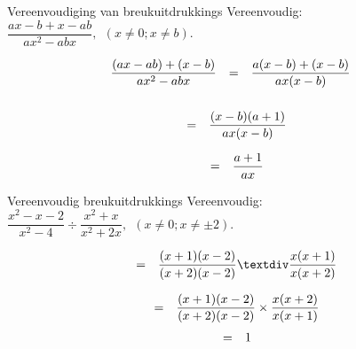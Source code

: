
\begin{wex}{Vereenvoudiging van breukuitdrukkings }{Vereenvoudig: $\dfrac{ax-b+x-ab}{a{x}^{2}-abx}, ~~(x \neq 0;x \neq b)$.}
{
\begin{equation*}
\begin{array}{lll}\dfrac{(ax-ab)+(x-b)}{a{x}^{2}-abx}\hfill & =& \dfrac{a(x-b)+(x-b)}{ax(x-b)}\hfill \\ \end{array}
\end{equation*}
\begin{equation*}
\begin{array}{lll}
\\& =& \dfrac{(x-b)(a+1)}{ax(x-b)}\hfill \end{array}
\end{equation*}

\begin{equation*}
\begin{array}{ccc}& =& \dfrac{a+1}{ax}\hfill \end{array}
\end{equation*}
}
\end{wex}


\begin{wex}{Vereenvoudig breukuitdrukkings }
{Vereenvoudig: $\dfrac{{x}^{2}-x-2}{{x}^{2}-4}÷\dfrac{{x}^{2}+x}{{x}^{2}+2x}, ~~(x \neq 0;x \neq \pm2)$.} 
{
\begin{equation*}
\begin{array}{ccc}& =& \dfrac{(x+1)(x-2)}{(x+2)(x-2)}÷\dfrac{x(x+1)}{x(x+2)}\hfill \end{array}
\end{equation*}


\begin{equation*}
\begin{array}{ccc}& =& \dfrac{(x+1)(x-2)}{(x+2)(x-2)}\ensuremath{\times}\dfrac{x(x+2)}{x(x+1)}\hfill \end{array}
\end{equation*}
\begin{equation*}
\begin{array}{ccc}& =& 1\hfill \end{array}
\end{equation*}
}
\end{wex}


